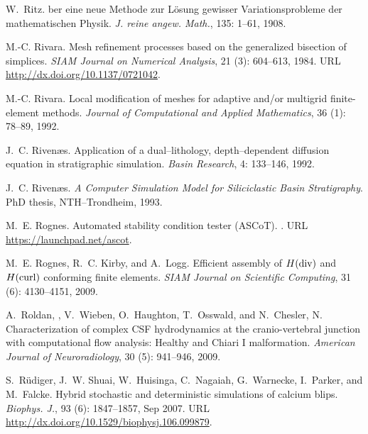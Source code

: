 \begin{thebibliography}{467}
W.~Ritz.
ber eine neue {M}ethode zur {L}\"osung gewisser
  {V}ariationsprobleme der mathematischen {P}hysik.
\newblock \emph{J. reine angew. Math.}, 135: 1--61, 1908.

M.-C. Rivara.
\newblock Mesh refinement processes based on the generalized bisection of
  simplices.
\newblock \emph{SIAM Journal on Numerical Analysis}, 21 (3):
  604--613, 1984.
\newblock URL \url{http://dx.doi.org/10.1137/0721042}.

M.-C. Rivara.
\newblock Local modification of meshes for adaptive and/or multigrid
  finite-element methods.
\newblock \emph{Journal of Computational and Applied Mathematics}, 36
  (1): 78--89, 1992.

J.~C. Riven{\ae}s.
\newblock Application of a dual--lithology, depth--dependent diffusion equation
  in stratigraphic simulation.
\newblock \emph{Basin Research}, 4: 133--146, 1992.

J.~C. Riven{\ae}s.
\newblock \emph{A Computer Simulation Model for Siliciclastic Basin
  Stratigraphy}.
\newblock PhD thesis, NTH--Trondheim, 1993.

M.~E. Rognes.
\newblock Automated stability condition tester ({ASCoT}).
.
\newblock URL \url{https://launchpad.net/ascot}.

M.~E. Rognes, R.~C. Kirby, and A.~Logg.
\newblock Efficient assembly of {$H({\rm div})$} and {$H({\rm curl})$}
  conforming finite elements.
\newblock \emph{SIAM Journal on Scientific Computing}, 31
  (6): 4130--4151, 2009.

A.~Roldan, , V.~Wieben, O.~Haughton, T.~Osswald, and N.~Chesler, N.
\newblock Characterization of complex {CSF} hydrodynamics at the
  cranio-vertebral junction with computational flow analysis: {H}ealthy and
  {C}hiari {I} malformation.
\newblock \emph{American Journal of Neuroradiology}, 30 (5):
  941--946, 2009.

S.~R\"udiger, J.~W. Shuai, W.~Huisinga, C.~Nagaiah, G.~Warnecke, I.~Parker, and
  M.~Falcke.
\newblock Hybrid stochastic and deterministic simulations of calcium blips.
\newblock \emph{Biophys. J.}, 93 (6): 1847--1857, Sep 2007.
\newblock URL \url{http://dx.doi.org/10.1529/biophysj.106.099879}.


\end{thebibliography}
